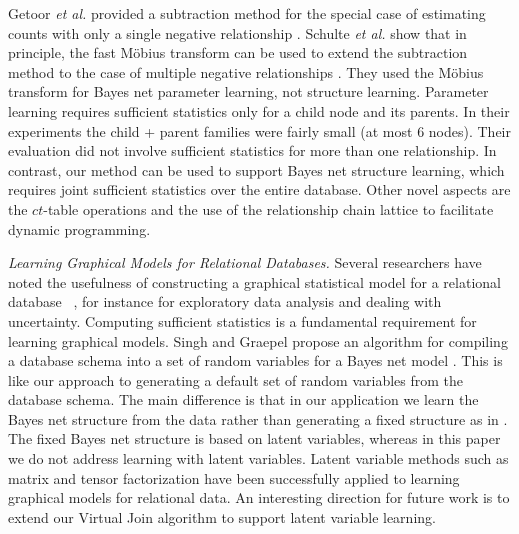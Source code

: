 \documentclass{vldb}
\newcommand{\ct}{\mathit{ct}}
\begin{document}
Getoor {\em et al.} provided a subtraction method for the special case of estimating counts with only a single negative relationship \cite[Sec.5.8.4.2]{Getoor2007c}. 
Schulte {\em et al.} show that in principle, the fast M\"obius transform can be used to extend the subtraction method to the case of multiple negative relationships \cite{Schulte2014}. They 
used the M\"obius transform for Bayes net parameter learning, not structure learning. Parameter learning requires sufficient statistics only for a child node and its parents. In their experiments %
the child + parent families were fairly small (at most 6 nodes). Their evaluation did not involve sufficient statistics for more than one relationship. In contrast, our method can be used to support Bayes net structure learning, which requires joint sufficient statistics over the entire database. Other novel aspects are the $\ct$-table operations and the use of the relationship chain lattice to facilitate dynamic programming. 

\emph{Learning Graphical Models for Relational Databases.} Several researchers have noted the usefulness of constructing a graphical statistical model for a relational database ~\cite{Deshpande2007,Graepel_CIKM13,Wang2008}, for instance for exploratory data analysis and dealing with uncertainty. Computing sufficient statistics is a fundamental requirement for learning graphical models. Singh and Graepel propose an algorithm for compiling a database schema into a set of random variables for a Bayes net model \cite{Graepel_CIKM13}. This is like our approach to generating a default set of random variables from the database schema. The main difference is that in our application we learn the Bayes net structure from the data rather than generating a fixed structure as in \cite{Graepel_CIKM13}. The fixed Bayes net structure is based on latent variables, whereas in this paper we do not address learning with latent variables. Latent variable methods such as matrix and tensor factorization  \cite{Papalexakis2013} have been successfully applied to learning graphical models for relational data. An interesting direction for future work is to extend our Virtual Join algorithm to support latent variable learning. 
\end{document}
